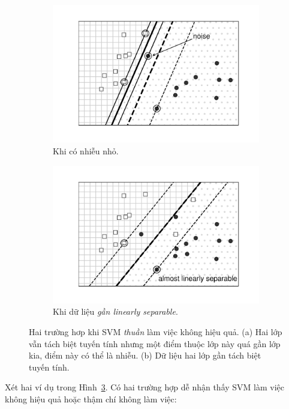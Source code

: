 \begin{figure}[t]
\begin{subfigure}{0.46\textwidth}
\includegraphics[width=0.95\linewidth]{ebookML_src/src/softmargin_svm/ssvm1.pdf}
\caption{Khi có nhiễu nhỏ.}
\label{fig:20_1a}
\end{subfigure}
\begin{subfigure}{0.48\textwidth}
\includegraphics[width=0.95\linewidth]{ebookML_src/src/softmargin_svm/ssvm2.pdf}
\caption{Khi dữ liệu \textit{gần linearly separable}.}
\label{fig:20_1b}
\end{subfigure}
\caption{Hai trường hơp khi SVM \textit{thuần} làm việc không hiệu quả. (a) Hai lớp vẫn tách biệt tuyến tính nhưng một điểm thuộc lớp này quá gần lớp kia, điểm này có thể là nhiễu. (b) Dữ liệu hai lớp gần tách biệt tuyến tính.}
\label{fig:20_1}
\end{figure}


Xét hai ví dụ trong Hình~\ref{fig:20_1}. Có hai trường hợp dễ nhận thấy SVM làm
việc không hiệu quả hoặc thậm chí không làm việc:

